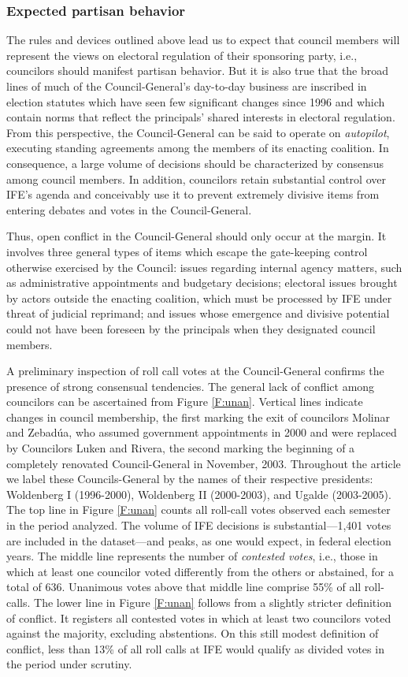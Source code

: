 \documentclass[12 pt]{article}
\begin{document}
\subsubsection{Expected partisan behavior}
The rules and devices outlined above lead us to expect that council members will represent the views on electoral regulation of their sponsoring party, i.e., councilors should manifest partisan behavior.  But it is also true that the broad lines of much of the Council-General's day-to-day business are inscribed in election statutes which have seen few significant changes since 1996 and which contain norms that reflect the principals' shared interests in electoral regulation.  From this perspective, the Council-General can be said to operate on \emph{autopilot}, executing standing agreements among the members of its enacting coalition.  In consequence, a large volume of decisions should be characterized by consensus among council members.  In addition, councilors retain substantial control over IFE's agenda and conceivably use it to prevent extremely divisive items from entering debates and votes in the Council-General.

Thus, open conflict in the Council-General should only occur at the margin.  It involves three general types of items which escape the gate-keeping control otherwise exercised by the Council:  issues regarding internal agency matters, such as administrative appointments and budgetary decisions; electoral issues brought by actors outside the enacting coalition, which must be processed by IFE under threat of judicial reprimand; and issues whose emergence and divisive potential could not have been foreseen by the principals when they designated council members.

A preliminary inspection of roll call votes at the Council-General confirms the presence of strong consensual tendencies.  The general lack of conflict among councilors can be ascertained from Figure \ref{F:unan}.  Vertical lines indicate changes in council membership, the first marking the exit of councilors Molinar and Zebad\'ua, who assumed government appointments in 2000 and were replaced by Councilors Luken and Rivera, the second marking the beginning of a completely renovated Council-General in November, 2003.  Throughout the article we label these Councils-General by the names of their respective presidents: Woldenberg I (1996-2000), Woldenberg II (2000-2003), and Ugalde (2003-2005).  The top line in Figure \ref{F:unan} counts all roll-call votes observed each semester in the period analyzed.  The volume of IFE decisions is substantial---1,401 votes are included in the dataset---and peaks, as one would expect, in federal election years.  The middle line represents the number of \emph{contested votes}, i.e., those in which at least one councilor voted differently from the others or abstained, for a total of 636.  Unanimous votes above that middle line comprise 55\% of all roll-calls. The lower line in Figure \ref{F:unan} follows from a slightly stricter definition of conflict.  It registers all contested votes in which at least two councilors voted against the majority, excluding abstentions.  On this still modest definition of conflict, less than 13\% of all roll calls at IFE would qualify as divided votes in the period under scrutiny.
\end{document}
